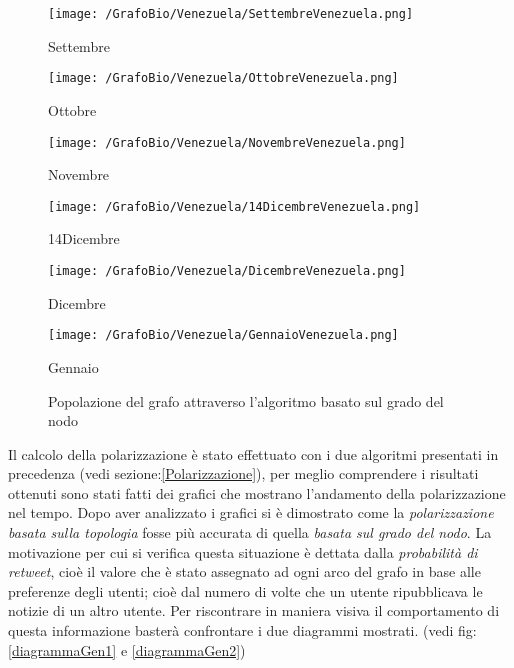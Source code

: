 \begin{figure}[!htbp]
\centering
\begin{minipage}[c]{.40\textwidth}
\centering\setlength{\captionmargin}{0pt}%
\texttt{[image: /GrafoBio/Venezuela/SettembreVenezuela.png]}
\caption{Settembre}
\label{Passo0}
\end{minipage}%
\hspace{10mm}%
\begin{minipage}[c]{.40\textwidth}
\centering\setlength{\captionmargin}{0pt}%
\texttt{[image: /GrafoBio/Venezuela/OttobreVenezuela.png]}
\caption{Ottobre}
\label{Passo1}
\end{minipage}
\hspace{10mm}%
\begin{minipage}[c]{.40\textwidth}
\centering\setlength{\captionmargin}{0pt}%
\texttt{[image: /GrafoBio/Venezuela/NovembreVenezuela.png]}
\caption{Novembre}
\label{Passo2}
\end{minipage}
\hspace{10mm}%
\begin{minipage}[c]{.40\textwidth}
\centering\setlength{\captionmargin}{0pt}%
\texttt{[image: /GrafoBio/Venezuela/14DicembreVenezuela.png]}
\caption{14Dicembre}
\label{Passo3}
\end{minipage}
\hspace{10mm}%
\begin{minipage}[c]{.40\textwidth}
\centering\setlength{\captionmargin}{0pt}%
\texttt{[image: /GrafoBio/Venezuela/DicembreVenezuela.png]}
\caption{Dicembre}
\label{Passo3}
\end{minipage}
\hspace{10mm}%
\begin{minipage}[c]{.40\textwidth}
\centering\setlength{\captionmargin}{0pt}%
\texttt{[image: /GrafoBio/Venezuela/GennaioVenezuela.png]}
\caption{Gennaio}
\label{Passo3}
\end{minipage}
\caption{Popolazione del grafo attraverso l'algoritmo basato sul grado del nodo}\label{grafoGrado}
\end{figure}

Il calcolo della polarizzazione è stato effettuato con i due algoritmi presentati in precedenza (vedi sezione:\ref{Polarizzazione}), per meglio comprendere i risultati ottenuti sono stati fatti dei grafici che mostrano l'andamento della polarizzazione nel tempo. 
Dopo aver analizzato i grafici si è dimostrato come la \textit{polarizzazione basata sulla topologia} fosse più accurata di quella \textit{basata sul grado del nodo}. La motivazione per cui si verifica questa situazione è dettata dalla \textit{probabilità di retweet}, cioè il valore che è stato assegnato ad ogni arco del grafo in base alle preferenze degli utenti; cioè dal numero di volte che un utente ripubblicava le notizie di un altro utente.
Per riscontrare in maniera visiva il comportamento di questa informazione basterà confrontare i due diagrammi mostrati. (vedi fig:\ref{diagrammaGen1} e \ref{diagrammaGen2}) 

